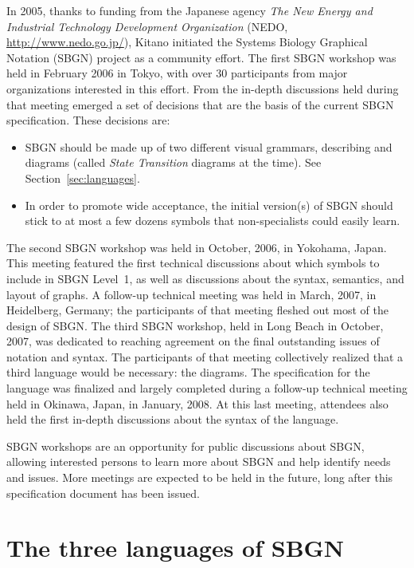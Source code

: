In 2005, thanks to funding from the Japanese agency \emph{The New Energy and Industrial Technology Development Organization} (NEDO, \url{http://www.nedo.go.jp/}), Kitano initiated the Systems Biology Graphical Notation (SBGN) project as a community effort.  The first SBGN workshop was held in February 2006 in Tokyo, with over 30 participants from major organizations interested in this effort.  From the in-depth discussions held during that meeting emerged a set of decisions that are the basis of the current SBGN specification.  These decisions are:

\begin{itemize}

\item SBGN should be made up of two different visual grammars, describing \ER{} and \PD{} diagrams (called \emph{State Transition} diagrams at the time).  See Section~\vref{sec:languages}.

\item In order to promote wide acceptance, the initial version(s) of SBGN should stick to at most a few dozens symbols that non-specialists could easily learn.

\end{itemize}

The second SBGN workshop was held in October, 2006, in Yokohama, Japan.  This meeting featured the first technical discussions about which symbols to include in SBGN Level~1, as well as discussions about the syntax, semantics, and layout of graphs.  A follow-up technical meeting was held in March, 2007, in Heidelberg, Germany; the participants of that meeting fleshed out most of the design of SBGN.  The third SBGN workshop, held in Long Beach in October, 2007, was dedicated to reaching agreement on the final outstanding issues of notation and syntax.  The participants of that meeting collectively realized that a third language would be necessary: the \AF diagrams.  The specification for the \PD language was finalized and largely completed during a follow-up technical meeting held in Okinawa, Japan, in January, 2008.  At this last meeting, attendees also held the first in-depth discussions about the syntax of the \ER language.

SBGN workshops are an opportunity for public discussions about SBGN, allowing interested persons to learn more about SBGN and help identify needs and issues.  More meetings are expected to be held in the future, long after this specification document has been issued.


\section{The three languages of SBGN}
\label{sec:languages}

